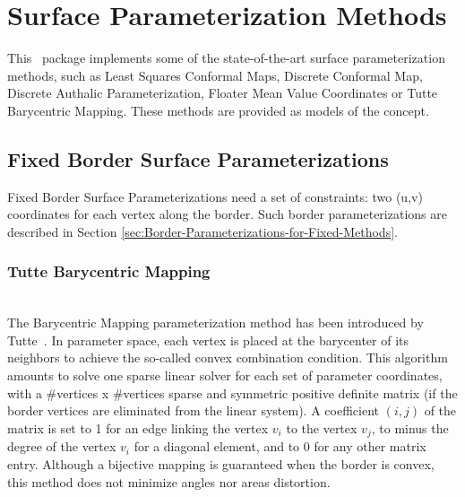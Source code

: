 \section{Surface Parameterization Methods
\label{sec:Surface-Parameterization-Methods}}

This \cgal\ package implements some of the state-of-the-art
surface parameterization methods, such as Least Squares Conformal Maps,
Discrete Conformal Map, Discrete Authalic
Parameterization, Floater Mean Value Coordinates or Tutte Barycentric
Mapping. These methods are provided as models of the
 concept.


\subsection{Fixed Border Surface Parameterizations}

Fixed Border Surface Parameterizations need a set of constraints: two
(u,v) coordinates for each vertex along the border.
Such border parameterizations are described in Section
\ref{sec:Border-Parameterizations-for-Fixed-Methods}.

\subsubsection{Tutte Barycentric Mapping}

  \\

The Barycentric Mapping parameterization method has been introduced by
Tutte~\cite{t-hdg-63}. In parameter space, each vertex is
placed at the barycenter of its neighbors to achieve the so-called
convex combination condition. This algorithm amounts to solve one
sparse linear solver for each set of parameter coordinates, with a
\#vertices x \#vertices sparse and symmetric positive definite matrix
(if the border vertices are eliminated from the linear system).
A coefficient $(i, j)$ of the matrix is set to 1 for an edge linking
the vertex $v_i$ to the vertex $v_j$, to minus the degree of the
vertex $v_i$ for a diagonal element, and to 0 for any other matrix
entry. Although a bijective mapping is guaranteed when the border is convex,
this method does not minimize angles nor areas distortion.

